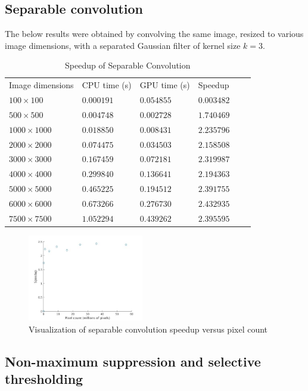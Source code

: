 \documentclass[journal]{IEEEtran}
\begin{document}
\subsection{Separable convolution}
The below results were obtained by convolving the same image, resized to various image dimensions, with a separated Gaussian filter of kernel size $k = 3$.
\begin{table}[H]
	\small
	\centering
	\caption{Speedup of Separable Convolution}
	\label{separable-convolution-speedup}
	\begin{tabular}{llllll}
	 Image dimensions & CPU time (s) & GPU time (s) & Speedup \\
	 $100 \times 100$ & $0.000191$ & $0.054855$ & $0.003482$ \\
	 $500 \times 500$ & $0.004748$ & $0.002728$ & $1.740469$ \\
	 $1000 \times 1000$ & $0.018850$ & $0.008431$ & $2.235796$ \\
	 $2000 \times 2000$ & $0.074475$ & $0.034503$ & $2.158508$ \\
	 $3000 \times 3000$ & $0.167459$ & $0.072181$ & $2.319987$ \\
	 $4000 \times 4000$ & $0.299840$ & $0.136641$ & $2.194363$ \\
	 $5000 \times 5000$ & $0.465225$ & $0.194512$ & $2.391755$ \\
	 $6000 \times 6000$ & $0.673266$ & $0.276730$ & $2.432935$ \\
	 $7500 \times 7500$ & $1.052294$ & $0.439262$ & $2.395595$ \\
	\end{tabular}
\end{table}
\begin{figure}[H]
	\centering
	\includegraphics[width=0.45\textwidth]{separable_convolution_speedup_graph.jpg}
	\caption{Visualization of separable convolution speedup versus pixel count}
    \label{separable-convolution-speedup-graph}
\end{figure}

\subsection{Non-maximum suppression and selective thresholding}
\end{document}
